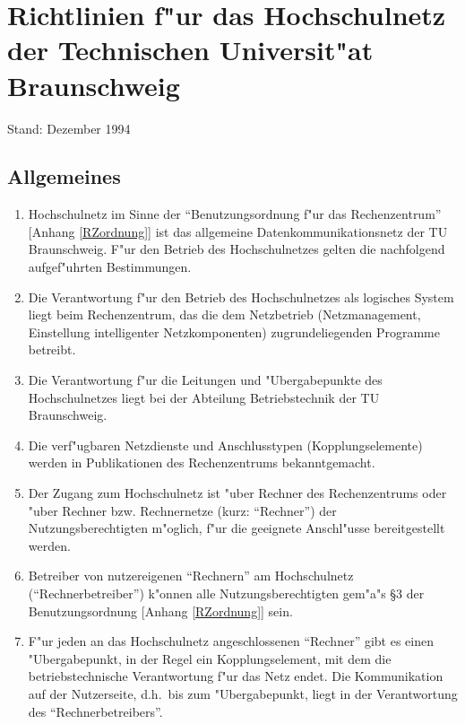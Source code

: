 
\section[Richtlinien f"ur das TUBS-Net]{Richtlinien f"ur das Hochschulnetz der
  Technischen Universit"at Braunschweig}
\label{TUBSnet-Richtlinien}

{\small Stand: Dezember 1994}

\subsection{Allgemeines}

\begin{enumerate}
  \item Hochschulnetz im Sinne der "`Benutzungsordnung f"ur das Rechenzentrum"'
    [Anhang \ref{RZordnung}] ist das allgemeine Datenkommunikationsnetz
    der TU Braunschweig. F"ur den Betrieb des Hochschulnetzes gelten die
    nachfolgend aufgef"uhrten Bestimmungen.

  \item Die Verantwortung f"ur den Betrieb des Hochschulnetzes
    als logisches System liegt beim Rechenzentrum, das die dem
    Netzbetrieb (Netzmanagement, Einstellung intelligenter
    Netzkomponenten) zugrundeliegenden Programme betreibt.

  \item Die Verantwortung f"ur die Leitungen und "Ubergabepunkte
    des Hochschulnetzes liegt bei der Abteilung Betriebstechnik
    der TU Braunschweig.

  \item Die verf"ugbaren Netzdienste und Anschlusstypen (Kopplungselemente)
    werden in Publikationen des Rechenzentrums bekanntgemacht.

  \item Der Zugang zum Hochschulnetz ist "uber Rechner des
    Rechenzentrums oder "uber Rechner bzw. Rechnernetze
    (kurz: "`Rechner"') der Nutzungsberechtigten m"oglich,
    f"ur die geeignete Anschl"usse bereitgestellt werden.

  \item Betreiber von nutzereigenen "`Rechnern"' am Hochschulnetz
    ("`Rechnerbetreiber"') k"onnen alle Nutzungsberechtigten
    gem"a"s \S{}3 der Benutzungsordnung [Anhang \ref{RZordnung}] sein.

  \item F"ur jeden an das Hochschulnetz angeschlossenen "`Rechner"'
    gibt es einen "Ubergabepunkt, in der Regel ein
    Kopplungselement, mit dem die betriebstechnische Verantwortung
    f"ur das Netz endet. Die Kommunikation auf der
    Nutzerseite, d.h.\  bis zum "Ubergabepunkt, liegt in der
    Verantwortung des "`Rechnerbetreibers"'.
\end{enumerate}

